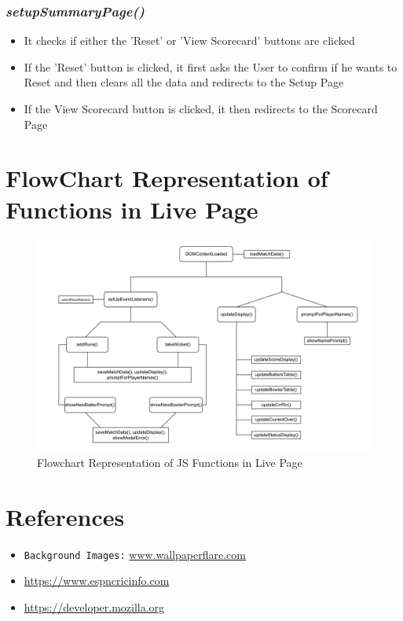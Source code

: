 \documentclass[a4paper,12pt]{article}
\begin{document}
\subsubsection{\textit{setupSummaryPage()}}
\begin{itemize}
\item It checks if either the 'Reset' or 'View Scorecard' buttons are clicked
\item If the 'Reset' button is clicked, it first asks the User to confirm if he wants to Reset and then clears all the data and redirects to the Setup Page 
\item If the View Scorecard button is clicked, it then redirects to the Scorecard Page
\end{itemize} 

\clearpage

\section{FlowChart Representation of Functions in Live Page}
\begin{figure}[h!]
\centering
\includegraphics[width=\textwidth]{images/flowchart.png}
\caption{Flowchart Representation of JS Functions in Live Page} 
\label{flowchart}
\end{figure}

\section{References}
\begin{itemize}
  \item \texttt{Background Images:} \url{www.wallpaperflare.com}
  \item \url{https://www.espncricinfo.com}
  \item \url{https://developer.mozilla.org}
\end{itemize}
\end{document}
